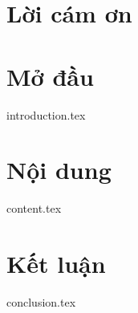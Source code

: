 \documentclass[oneside]{report}
\begin{document}



\newpage


\newpage


\newpage

\pagestyle{fancy}

\chapter*{Lời cám ơn}

\newpage


\newpage

% 

\tableofcontents
\cleardoublepage{}
{}
\listoftables
\cleardoublepage{}
{}
\listoffigures
\chapter{Mở đầu}
{introduction.tex}
\chapter{Nội dung}
{content.tex}
\chapter{Kết luận}
{conclusion.tex}
\end{document}
